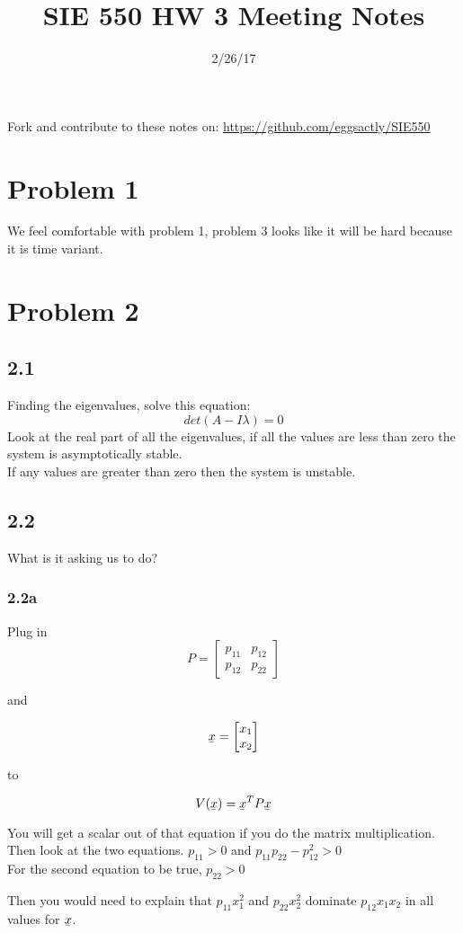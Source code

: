 \documentclass[12pt]{article}
\newcommand{\ubar}[1]{\underaccent{\bar}{#1}}
\begin{document}
\title{SIE 550 HW 3 Meeting Notes}
\date{2/26/17}

\maketitle

Fork and contribute to these notes on: \url{https://github.com/eggsactly/SIE550}

\section*{Problem 1} 
We feel comfortable with problem 1, problem 3 looks like it will be hard because it is time variant. 

\section*{Problem 2} 
\subsection*{2.1}
Finding the eigenvalues, solve this equation:
$$det(A-I\lambda)=0$$
Look at the real part of all the eigenvalues, if all the values are less than zero the system is asymptotically stable.\\
If any values are greater than zero then the system is unstable. 

\subsection*{2.2}
What is it asking us to do?

\subsubsection*{2.2a}
Plug in 
$$P=\begin{bmatrix} p_{11} & p_{12} \\
p_{12} & p_{22}
\end{bmatrix}$$ 

and 

$$\ubar{x}=\begin{bmatrix} x_{1} \\
x_{2}
\end{bmatrix}$$ 

to

$$V(\ubar{x})=\ubar{x}^TP\ubar{x}$$

You will get a scalar out of that equation if you do the matrix multiplication. Then look at the two equations. 
$p_{11}>0$ 
and
$p_{11}p_{22}-p_{12}^2>0$ \\

For the second equation to be true, $p_{22}>0$ 

Then you would need to explain that $p_{11}x_{1}^2$ and $p_{22}x_{2}^2$ dominate $p_{12}x_1x_2$ in all values for $\ubar{x}$. 
\end{document}
